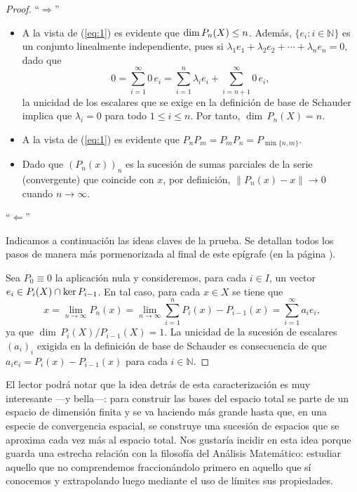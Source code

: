 		\begin{proof}
			\noindent``$\Longrightarrow$''
			\begin{itemize}
				\item[$(a)$]{A la vista de (\ref{eq:1}) es evidente que ${\rm dim}\,P_n(X)\leq n$. Además, $\{e_i\colon i\in\mathbb{N}\}$ es un conjunto linealmente independiente, pues si $\lambda_1e_1+\lambda_2 e_2+\cdots+\lambda_ne_n=0$, dado que 
					\[0=\sum_{i=1}^{\infty}0\,e_i=\sum_{i=1}^n{\lambda_ie_i} + \sum_{i=n+1}^{\infty}0\,e_i,\]
					la unicidad de los escalares que se exige en la definición de base de Schauder implica que $\lambda_i=0$ para todo $1\leq i\leq n$.  Por tanto, $\dim\,P_n(X)=n$.}
				\item[$(b)$]{A la vista de (\ref{eq:1}) es evidente que $P_nP_m=P_mP_n=P_{\min\{n,m\}}$.}
				\item[$(c)$]{Dado que $(P_n(x))_n$ es la sucesión de sumas parciales de la serie (convergente) que coincide con $x$, por definición, $\|P_n(x)-x\|\to 0$ cuando $n\to\infty$.}
			\end{itemize}\medskip
			
			\noindent``$\Longleftarrow$''
			
			Indicamos a continuación las ideas claves de la prueba. Se detallan todos los pasos de manera más pormenorizada al final de este epígrafe (en la página \pageref{D:proyecciones}).
			
			Sea $P_0\equiv 0$ la aplicación nula y consideremos, para cada $i\in I$, un vector $e_i\in P_i(X)\cap 
			{\rm ker}\,P_{i-1}$. En tal caso, para cada $x\in X$ se tiene que
			\[x=\lim_{n\to\infty}{P_n(x)}=\lim_{n\to\infty}\sum_{i=1}^nP_i(x) - P_{i-1}(x)=  \sum_{i=1}^\infty a_ie_i,\]
			ya que $\dim\,P_i(X)/P_{i-1}(X)=1$. La unicidad de la sucesión de escalares $(a_i)_i$ exigida en la definición de base de Schauder es consecuencia de que $a_ie_i=P_i(x)-P_{i-1}(x)$ para cada $i\in\mathbb{N}$.
		\end{proof}
	
	
	El lector podrá notar que la idea detrás de esta caracterización es muy interesante ---y bella---: para construir las bases del espacio total se parte de un espacio de dimensión finita y se va haciendo más grande hasta que, en una especie de convergencia espacial, se construye una sucesión de espacios que se aproxima cada vez más al espacio total. Nos gustaría incidir en esta idea porque guarda una estrecha relación con la filosofía del Análisis Matemático: estudiar aquello que no comprendemos fraccionándolo primero en aquello que sí conocemos y extrapolando luego mediante el uso de límites sus propiedades.
	
